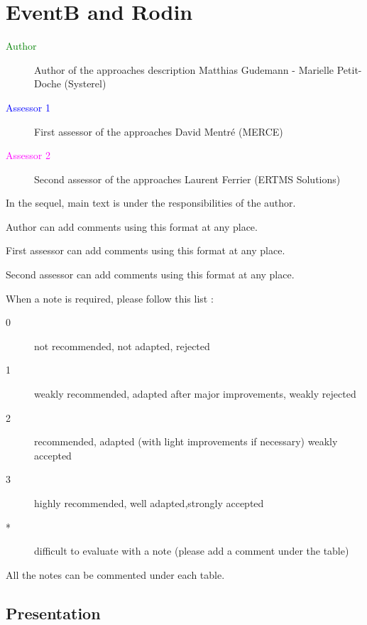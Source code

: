 \chapter{EventB and Rodin}
\label{chap:eventB}

\begin{description}
\item[\textcolor{green}{Author}] Author of the approaches description  Matthias Gudemann - Marielle Petit-Doche (Systerel)
\item[\textcolor{blue}{Assessor 1}] First assessor of the approaches David Mentré (MERCE)
\item[\textcolor{magenta}{Assessor 2}] Second assessor of the approaches Laurent Ferrier (ERTMS Solutions)
\end{description}

In the sequel, main text is under the responsibilities of the author.

\begin{author_comment}
Author can add comments using this format at any place.
\end{author_comment}

\begin{assessor1}
First assessor can add comments using this format at any place.
\end{assessor1}

\begin{assessor2}
Second assessor can add comments using this format at any place.
\end{assessor2}

When a note is required, please follow this list :
\begin{description}
\item[0] not recommended, not adapted, rejected
\item[1] weakly recommended, adapted after major improvements, weakly rejected
\item[2] recommended, adapted (with light improvements if necessary)  weakly accepted
\item[3] highly recommended, well adapted,strongly accepted
\item[*] difficult to evaluate with a note (please add a comment under the table)
\end{description}

All the notes can be commented under each table.

\section{Presentation}

